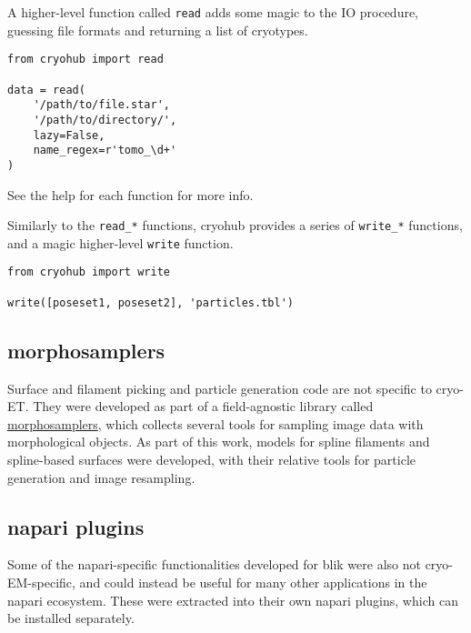 A higher-level function called \texttt{read} adds some magic to the IO procedure, guessing file formats and returning a list of cryotypes.

\begin{verbatim}
from cryohub import read

data = read(
    '/path/to/file.star',
    '/path/to/directory/',
    lazy=False,
    name_regex=r'tomo_\d+'
)
\end{verbatim}

See the help for each function for more info.

Similarly to the \texttt{read\_*} functions, cryohub provides a series of \texttt{write\_*} functions, and a magic higher-level \texttt{write} function.

\begin{verbatim}
from cryohub import write

write([poseset1, poseset2], 'particles.tbl')
\end{verbatim}

\subsection{morphosamplers}\label{morphosamplers}

Surface and filament picking and particle generation code are not specific to cryo-ET. They were developed as part of a field-agnostic library called \href{https://github.com/morphometrics/morphosamplers}{morphosamplers}, which collects several tools for sampling image data with morphological objects. As part of this work, models for spline filaments and spline-based surfaces were developed, with their relative tools for particle generation and image resampling.

\subsection{napari plugins}\label{napari-plugins}

Some of the napari-specific functionalities developed for blik were also not cryo-EM-specific, and could instead be useful for many other applications in the napari ecosystem. These were extracted into their own napari plugins, which can be installed separately.

